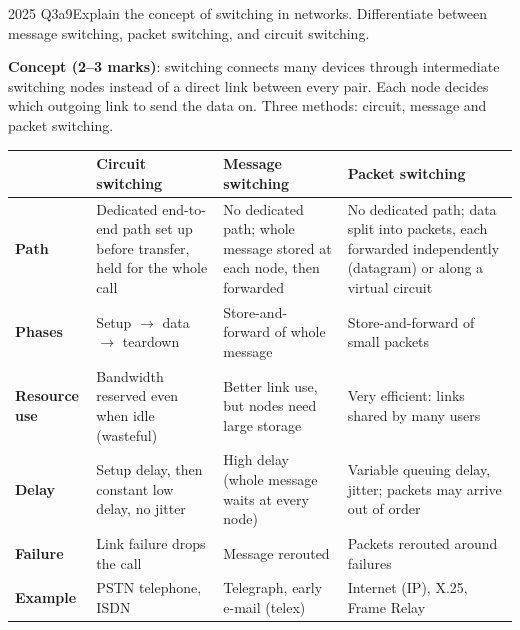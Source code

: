 \documentclass[10pt]{article}
\begin{document}
\begin{pastq}{2025 Q3a}{9}Explain the concept of switching in networks. Differentiate between message switching, packet switching, and circuit switching.\end{pastq}
\begin{ans}
\textbf{Concept (2--3 marks)}: switching connects many devices through intermediate switching nodes instead of a direct link between every pair. Each node decides which outgoing link to send the data on. Three methods: circuit, message and packet switching.

\small
\begin{tabularx}{\linewidth}{@{}>{\bfseries}p{1.6cm}XXX@{}}
\toprule
 & Circuit switching & Message switching & Packet switching\\\midrule
Path & Dedicated end-to-end path set up before transfer, held for the whole call & No dedicated path; whole message stored at each node, then forwarded & No dedicated path; data split into packets, each forwarded independently (datagram) or along a virtual circuit\\
Phases & Setup $\to$ data $\to$ teardown & Store-and-forward of whole message & Store-and-forward of small packets\\
Resource use & Bandwidth reserved even when idle (wasteful) & Better link use, but nodes need large storage & Very efficient: links shared by many users\\
Delay & Setup delay, then constant low delay, no jitter & High delay (whole message waits at every node) & Variable queuing delay, jitter; packets may arrive out of order\\
Failure & Link failure drops the call & Message rerouted & Packets rerouted around failures\\
Example & PSTN telephone, ISDN & Telegraph, early e-mail (telex) & Internet (IP), X.25, Frame Relay\\
\bottomrule
\end{tabularx}
\end{ans}
\end{document}
